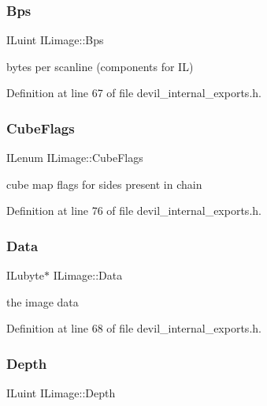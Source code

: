 \subsubsection{\texorpdfstring{Bps}{Bps}}
{\footnotesize\ttfamily I\+Luint I\+Limage\+::\+Bps}



bytes per scanline (components for IL) 



Definition at line 67 of file devil\+\_\+internal\+\_\+exports.\+h.

\mbox{\label{structILimage_a20bd452e1573aa08c7d9687190cbfa89}} 
\subsubsection{\texorpdfstring{Cube\+Flags}{CubeFlags}}
{\footnotesize\ttfamily I\+Lenum I\+Limage\+::\+Cube\+Flags}



cube map flags for sides present in chain 



Definition at line 76 of file devil\+\_\+internal\+\_\+exports.\+h.

\mbox{\label{structILimage_ab7a9627719d89abb3cb48087452acbc8}} 
\subsubsection{\texorpdfstring{Data}{Data}}
{\footnotesize\ttfamily I\+Lubyte$\ast$ I\+Limage\+::\+Data}



the image data 



Definition at line 68 of file devil\+\_\+internal\+\_\+exports.\+h.

\mbox{\label{structILimage_a00e19fb6f1e50731d114c302129112d9}} 
\subsubsection{\texorpdfstring{Depth}{Depth}}
{\footnotesize\ttfamily I\+Luint I\+Limage\+::\+Depth}



